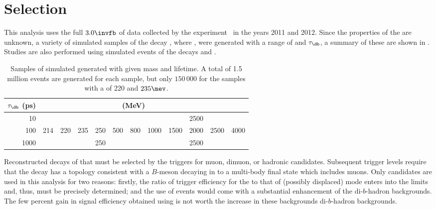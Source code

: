 \section{Selection}
\label{sec:db:sel}

This analysis uses the full $3.0\invfb$ of data collected by the \lhcb
experiment~\cite{Alves:2008zz} in the years 2011 and 2012.
Since the properties of the \db are unknown, a variety of simulated samples of the decay \btokstrdb,
where \dbtomumu, were generated with a range of \mass{\db} and $\tau_\db$, a summary of these are
shown in .
Studies are also performed using simulated events of the decays \btokstrmumu and \btojpsikstr.

\begin{table}
  \begin{center}
    \begin{tabular}{rccccccccccc}\toprule
      $\tau_\db$ (ps) & \multicolumn{10}{c}{\mass{\db} (MeV)} \\\midrule
      10 &&&&&&&&&2500 \\
      100 &214&220&235&250&500&800&1000&1500&2000&2500&4000 \\
      1000 &&&&250&&&&&2500 \\
      \bottomrule
    \end{tabular}
  \end{center}
  \caption[Samples of simulated \btokstrdb generated for the analysis]{
    Samples of simulated \btokstrdb generated with given mass and lifetime.
    A total of 1.5 million events are generated for each sample, but only $150\,000$ for the
    samples with a \mass{\db} of 220 and $235\mev$.
  }
  \label{tab:db:samples}
\end{table}

Reconstructed decays of \btokstrdb that must be selected by the \lone triggers for
muon, dimuon, or hadronic candidates.
Subsequent trigger levels require that the decay has a topology consistent with a $B$-meson
decaying in to a multi-body final state which includes muons.
Only \TOS candidates are used in this analysis for two reasons: firstly, the ratio of trigger
efficiency for the \sm \btokstrmumu to that of (possibly displaced) \db mode enters
into the limits and, thus, must be precisely determined; and the use of \TIS events would
come with a substantial enhancement of the di-$b$-hadron backgrounds.
The few percent gain in signal efficiency obtained using \TIS is not worth the increase in these
backgrounds di-$b$-hadron backgrounds.


